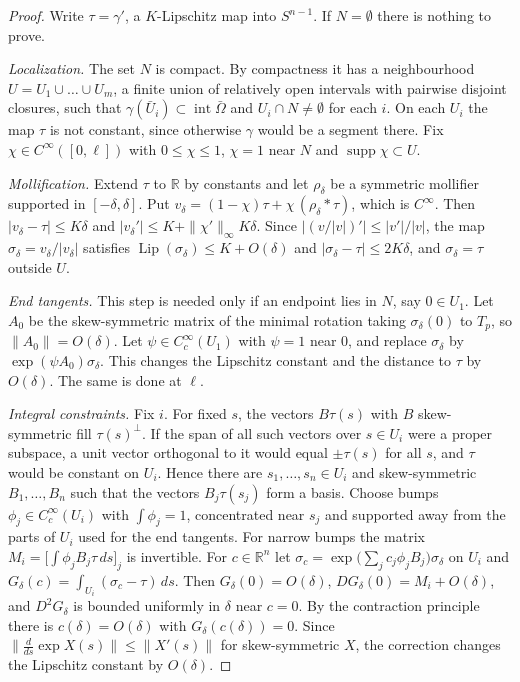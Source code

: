 \documentclass[11pt,reqno]{amsart}
\theoremstyle{definition}
\providecommand{\R}{\mathbb{R}}
\numberwithin{equation}{section}
\providecommand{\R}{\mathbb{R}}
\begin{document}
\begin{proof}
Write $\tau = \gamma'$, a $K$-Lipschitz map into $S^{n-1}$. If $N = \emptyset$ there is nothing to prove.

\emph{Localization.} The set $N$ is compact. By compactness it has a neighbourhood $U = U_1 \cup \dots \cup U_m$, a finite union of relatively open intervals with pairwise disjoint closures, such that $\gamma(\bar U_i) \subset \operatorname{int}\bar\Omega$ and $U_i \cap N \ne \emptyset$ for each $i$. On each $U_i$ the map $\tau$ is not constant, since otherwise $\gamma$ would be a segment there. Fix $\chi \in C^\infty([0,\ell])$ with $0 \le \chi \le 1$, $\chi = 1$ near $N$ and $\operatorname{supp}\chi \subset U$.

\emph{Mollification.} Extend $\tau$ to $\R$ by constants and let $\rho_\delta$ be a symmetric mollifier supported in $[-\delta, \delta]$. Put $v_\delta = (1-\chi)\tau + \chi\,(\rho_\delta * \tau)$, which is $C^\infty$. Then $|v_\delta - \tau| \le K\delta$ and $|v_\delta'| \le K + \|\chi'\|_\infty K\delta$. Since $|(v/|v|)'| \le |v'|/|v|$, the map $\sigma_\delta = v_\delta/|v_\delta|$ satisfies $\operatorname{Lip}(\sigma_\delta) \le K + O(\delta)$ and $|\sigma_\delta - \tau| \le 2K\delta$, and $\sigma_\delta = \tau$ outside $U$.

\emph{End tangents.} This step is needed only if an endpoint lies in $N$, say $0 \in U_1$. Let $A_0$ be the skew-symmetric matrix of the minimal rotation taking $\sigma_\delta(0)$ to $T_p$, so $\|A_0\| = O(\delta)$. Let $\psi \in C_c^\infty(U_1)$ with $\psi = 1$ near $0$, and replace $\sigma_\delta$ by $\exp(\psi A_0)\sigma_\delta$. This changes the Lipschitz constant and the distance to $\tau$ by $O(\delta)$. The same is done at $\ell$.

\emph{Integral constraints.} Fix $i$. For fixed $s$, the vectors $B\tau(s)$ with $B$ skew-symmetric fill $\tau(s)^\perp$. If the span of all such vectors over $s \in U_i$ were a proper subspace, a unit vector orthogonal to it would equal $\pm\tau(s)$ for all $s$, and $\tau$ would be constant on $U_i$. Hence there are $s_1, \dots, s_n \in U_i$ and skew-symmetric $B_1, \dots, B_n$ such that the vectors $B_j\tau(s_j)$ form a basis. Choose bumps $\phi_j \in C_c^\infty(U_i)$ with $\int\phi_j = 1$, concentrated near $s_j$ and supported away from the parts of $U_i$ used for the end tangents. For narrow bumps the matrix $M_i = \big[\int \phi_j B_j \tau\, ds\big]_j$ is invertible. For $c \in \R^n$ let $\sigma_c = \exp\big(\sum_j c_j\phi_j B_j\big)\sigma_\delta$ on $U_i$ and $G_\delta(c) = \int_{U_i} (\sigma_c - \tau)\,ds$. Then $G_\delta(0) = O(\delta)$, $DG_\delta(0) = M_i + O(\delta)$, and $D^2G_\delta$ is bounded uniformly in $\delta$ near $c = 0$. By the contraction principle there is $c(\delta) = O(\delta)$ with $G_\delta(c(\delta)) = 0$. Since $\|\tfrac{d}{ds}\exp X(s)\| \le \|X'(s)\|$ for skew-symmetric $X$, the correction changes the Lipschitz constant by $O(\delta)$.


\end{proof}
\end{document}

